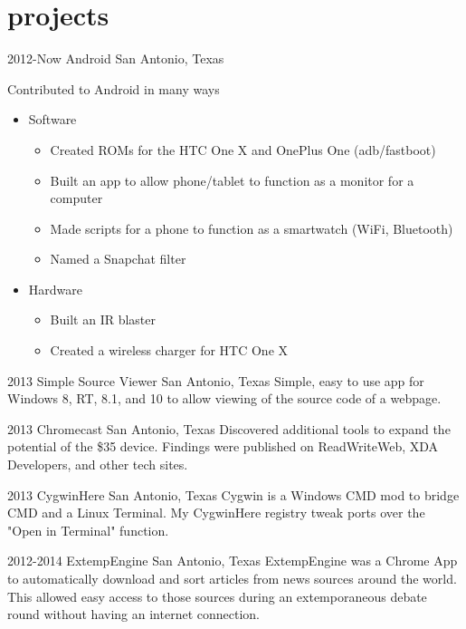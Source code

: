 \documentclass[]{friggeri-cv} %
\begin{document}

\section{projects}

\begin{entrylist}


\entry
{2012-Now}
{Android}
{San Antonio, Texas}
{Contributed to Android in many ways 
\begin{itemize}
	\item Software
	\begin{itemize} 
		\item Created ROMs for the HTC One X and OnePlus One (adb/fastboot)  
		\item Built an app to allow phone/tablet to function as a  monitor for a computer
		\item Made scripts for a phone to function as a smartwatch (WiFi, Bluetooth)
		\item Named a Snapchat filter 
	\end{itemize} 
	\item Hardware 
	\begin{itemize}
		\item Built an IR blaster 
		\item Created a wireless charger for HTC One X 
	\end{itemize}
\end{itemize}
}


\entry
{2013}
{Simple Source Viewer}
{San Antonio, Texas}
{Simple, easy to use app for Windows 8, RT, 8.1, and 10 to allow viewing of the source code of a webpage.}


\entry
{2013}
{Chromecast}
{San Antonio, Texas}
{Discovered additional tools to expand the potential of the \$35 device. Findings were published on ReadWriteWeb, XDA Developers, and other tech sites.}


\entry
{2013}
{CygwinHere}
{San Antonio, Texas}
{Cygwin is a Windows CMD mod to bridge CMD and a Linux Terminal. My CygwinHere registry tweak ports over the "Open in Terminal" function.}


\entry
{2012-2014}
{ExtempEngine}
{San Antonio, Texas}
{ExtempEngine was a Chrome App to automatically download and sort articles from news sources around the world. This allowed easy access to those sources during an extemporaneous debate round without having an internet connection.}


\end{entrylist}
\end{document}
